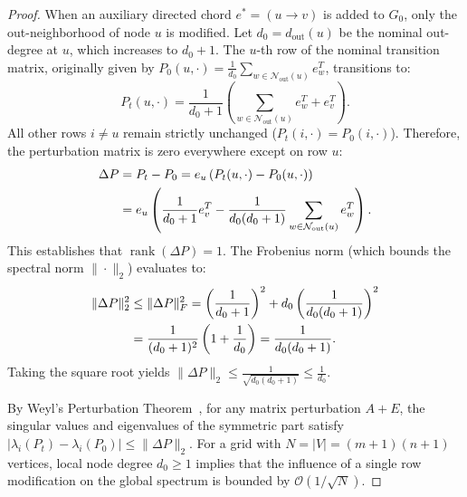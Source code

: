 \documentclass[11pt,a4paper]{article}
\begin{document}
\begin{proof}
When an auxiliary directed chord $e^* = (u \to v)$ is added to $G_0$, only the out-neighborhood of node $u$ is modified. Let $d_0 = d_{\text{out}}(u)$ be the nominal out-degree at $u$, which increases to $d_0 + 1$. The $u$-th row of the nominal transition matrix, originally given by $P_0(u, \cdot) = \frac{1}{d_0} \sum_{w \in \mathcal{N}_{\text{out}}(u)} e_w^T$, transitions to:
\begin{equation}
P_t(u, \cdot) = \frac{1}{d_0 + 1} \left( \sum_{w \in \mathcal{N}_{\text{out}}(u)} e_w^T + e_v^T \right).
\end{equation}
All other rows $i \ne u$ remain strictly unchanged ($P_t(i, \cdot) = P_0(i, \cdot)$). Therefore, the perturbation matrix is zero everywhere except on row $u$:
\begin{align}
\Delta P &= P_t - P_0 = e_u \left( P_t(u, \cdot) - P_0(u, \cdot) \right) \notag \\
&= e_u \left( \frac{1}{d_0 + 1} e_v^T - \frac{1}{d_0 (d_0 + 1)} \sum_{w \in \mathcal{N}_{\text{out}}(u)} e_w^T \right).
\end{align}
This establishes that $\operatorname{rank}(\Delta P) = 1$. The Frobenius norm (which bounds the spectral norm $\|\cdot\|_2$) evaluates to:
\begin{align}
\|\Delta P\|_2^2 &\le \|\Delta P\|_F^2 = \left( \frac{1}{d_0 + 1} \right)^2 + d_0 \left( \frac{1}{d_0 (d_0 + 1)} \right)^2 \notag \\
&= \frac{1}{(d_0 + 1)^2} \left( 1 + \frac{1}{d_0} \right) = \frac{1}{d_0 (d_0 + 1)}.
\end{align}
Taking the square root yields $\|\Delta P\|_2 \le \frac{1}{\sqrt{d_0 (d_0 + 1)}} \le \frac{1}{d_0}$.

By Weyl's Perturbation Theorem~\cite{bhatia1997matrix, weyl1912asymptotische}, for any matrix perturbation $A + E$, the singular values and eigenvalues of the symmetric part satisfy $|\lambda_i(P_t) - \lambda_i(P_0)| \le \|\Delta P\|_2$. For a grid with $N = |V| = (m+1)(n+1)$ vertices, local node degree $d_0 \ge 1$ implies that the influence of a single row modification on the global spectrum is bounded by $\mathcal{O}(1/\sqrt{N})$.


\end{proof}
\end{document}

